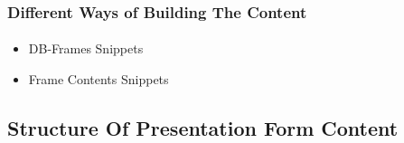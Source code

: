 \begin{frame}[fragile,label=DifferentWaysofBuildingTheContent]
    \frametitle{Different Ways of Building The Content}
    \framesubtitle{}

    \begin{itemize}
    \item DB-Frames Snippets
    \item Frame Contents Snippets
    \end{itemize}

\end{frame}



\begin{comment}
**  [[elisp:(org-cycle)][| ]] [[elisp:(org-show-subtree)][|=]] [[elisp:(show-children 10)][|V]] [[elisp:(bx:orgm:indirectBufOther)][|>]] [[elisp:(bx:orgm:indirectBufMain)][|I]] [[elisp:(blee:ppmm:org-mode-toggle)][|N]] [[elisp:(org-top-overview)][|O]] [[elisp:(progn (org-shifttab) (org-content))][|C]] [[elisp:(delete-other-windows)][|1]]  /Subsection/   Structure Of Presentation Form Content ::  [[elisp:(org-cycle)][| ]]
\end{comment}

\subsection{Structure Of Presentation Form Content}

\begin{comment}
*****  [[elisp:(org-cycle)][| ]]  [[elisp:(blee:ppmm:org-mode-toggle)][Nat]] [[elisp:(beginning-of-buffer)][Top]] [[elisp:(delete-other-windows)][(1)]] || /Frame/ *Label=StructureOfPresentationFormContent*  Structure Of Presentation Form Content ::  [[elisp:(org-cycle)][| ]]
\end{comment}

